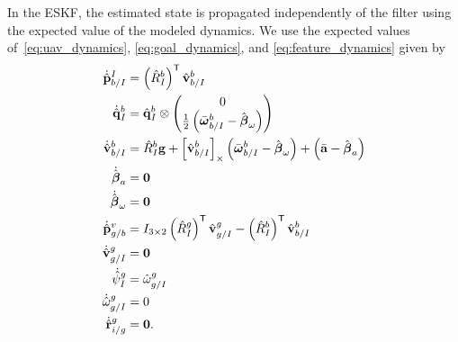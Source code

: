 In the ESKF, the estimated state is propagated independently of the filter using
the expected value of the modeled dynamics. We use the expected values
of~\eqref{eq:uav_dynamics}, \eqref{eq:goal_dynamics}, and
\eqref{eq:feature_dynamics} given by
\begin{align}
  \dot{\hat{\boldsymbol{\mathrm{p}}}}_{b/I}^I
  &=
  \left( \hat{R}_I^b \right)^{\mathsf{T}} \hat{\boldsymbol{\mathrm{v}}}_{b/I}^b
  \label{eq:estimated_dynamics}
  \\
  \dot{\hat{\boldsymbol{\mathrm{q}}}}_{I}^{b} 
  &= 	
  \hat{\boldsymbol{\mathrm{q}}}_I^b \otimes \begin{pmatrix} 0 \\ \frac{1}{2}
  \left( \bar{\boldsymbol{\mathrm{\omega}}}_{b/I}^b - \hat{\boldsymbol{\mathrm{\beta}}}_\omega \right)
\end{pmatrix} \nonumber \\
  \dot{\hat{\boldsymbol{\mathrm{v}}}}_{b/I}^b 
  &=
  \hat{R}_I^b \boldsymbol{\mathrm{g}}
  +
  \left[ \hat{\boldsymbol{\mathrm{v}}}_{b/I}^b \right]_{\times}
  \left( \bar{\boldsymbol{\mathrm{\omega}}}_{b/I}^b - \hat{\boldsymbol{\mathrm{\beta}}}_\omega \right)
  +
  \left( \bar{\boldsymbol{\mathrm{a}}} - \hat{\boldsymbol{\mathrm{\beta}}}_a \right) \nonumber
  \\
  \dot{\hat{\boldsymbol{\mathrm{\beta}}}}_a &= \boldsymbol{\mathrm{0}} \nonumber
  \\
  \dot{\hat{\boldsymbol{\mathrm{\beta}}}}_\omega &= \boldsymbol{\mathrm{0}} \nonumber
  \\
  \dot{\hat{\boldsymbol{\mathrm{p}}}}_{g/b}^{v} &= I_{3 \times 2} \left( \hat{R}_{I}^{g} \right)^{\mathsf{T}}
   \hat{\boldsymbol{\mathrm{v}}}_{g/I}^{g} - \left( \hat{R}_{I}^{b} \right)^{\mathsf{T}}
  \hat{\boldsymbol{\mathrm{v}}}_{b/I}^{b} \nonumber \\
  \dot{\hat{\boldsymbol{\mathrm{v}}}}_{g/I}^{g} &= \boldsymbol{\mathrm{0}} \nonumber \\
  \dot{\hat{\psi}}_{I}^{g} &= \hat{\omega}_{g/I}^g \nonumber \\
  \dot{\hat{\omega}}_{g/I}^{g} &= 0 \nonumber \\
  \dot{\hat{\boldsymbol{\mathrm{r}}}}_{i/g}^g &= \boldsymbol{\mathrm{0}}. \nonumber
\end{align}

